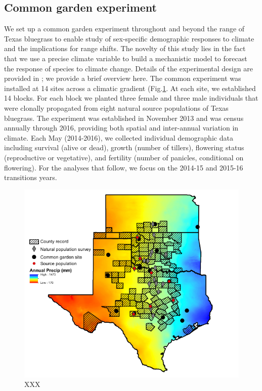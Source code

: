 \documentclass[12pt]{article}
\begin{document}
\subsection*{Common garden experiment}
We set up a common garden experiment throughout and beyond the range of Texas bluegrass to enable study of sex-specific demographic responses to climate and the implications for range shifts. 
The novelty of this study lies in the fact that we use a precise climate variable to build a mechanistic model to forecast the response of species to climate change.
Details of the experimental design are provided in \cite{miller2022two}; we provide a brief overview here. 
The common experiment was installed at 14 sites across a climatic gradient (Fig.\ref{fig:study_design}.
At each site, we established 14 blocks. 
For each block we planted three female and three male individuals that were clonally propagated from eight natural source populations of Texas bluegrass. 
The experiment was established in November 2013 and was census annually through 2016, providing both spatial and inter-annual variation in climate. 
Each May (2014-2016), we collected individual demographic data including survival (alive or dead), growth (number of tillers), flowering status (reproductive or vegetative), and fertility (number of panicles, conditional on flowering). 
For the analyses that follow, we focus on the 2014-15 and 2015-16 transitions years.

\begin{figure}[H]
  \begin{center}
    \includegraphics[width=0.90\linewidth]{Figures/POAR_BONAP_survey_garden_map.pdf}
  \caption{XXX}
  \label{fig:study_design}
  \end{center}
\end{figure}
\end{document}
